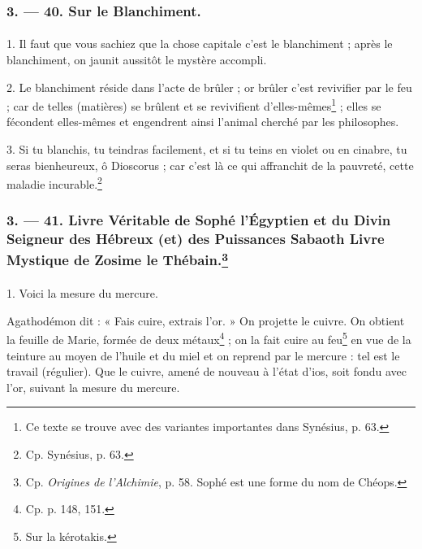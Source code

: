 \documentclass[a4paper, 11pt, oneside, polutonikogreek, french]{article}
\begin{document}
\bigskip
\centerline{\EightStarTaper}
\centerline{\EightStarTaper\EightStarTaper}
\bigskip

\subsubsection{3. --- 40. Sur le Blanchiment.}
\paragraph{}
1. Il faut que vous sachiez que la chose capitale c'est le blanchiment ; après le blanchiment, on jaunit aussitôt le mystère accompli.

2. Le blanchiment réside dans l'acte de brûler ; or brûler c'est revivifier par le feu ; car de telles (matières) se brûlent et se revivifient d'elles-mêmes\footnote{Ce texte se trouve avec des variantes importantes dans Synésius, p. 63.} ; elles se fécondent elles-mêmes et engendrent ainsi l'animal cherché par les philosophes.

3. Si tu blanchis, tu teindras facilement, et si tu teins en violet ou en cinabre, tu seras bienheureux, ô Dioscorus ; car c'est là ce qui affranchit de la pauvreté, cette maladie incurable.\footnote{Cp. Synésius, p. 63.}

\bigskip
\centerline{\EightStarTaper}
\centerline{\EightStarTaper\EightStarTaper}
\bigskip

\subsubsection[3. --- 41. Livre Véritable de Sophé l'Égyptien et du Divin Seigneur des Hébreux (et) des Puissances Sabaoth Livre Mystique de Zosime le Thébain.]{3. --- 41. Livre Véritable de Sophé l'Égyptien et du Divin Seigneur des Hébreux (et) des Puissances Sabaoth Livre Mystique de Zosime le Thébain.\footnote{Cp. \emph{Origines de l'Alchimie}, p. 58. Sophé est une forme du nom de Chéops.}}
\paragraph{}
1. Voici la mesure du mercure.

Agathodémon dit : « Fais cuire, extrais l'or. » On projette le cuivre. On obtient la feuille de Marie, formée de deux métaux\footnote{Cp. p. 148, 151.} ; on la fait cuire au feu\footnote{Sur la kérotakis.} en vue de la teinture au moyen de l'huile et du miel et on reprend par le mercure : tel est le travail (régulier). Que le cuivre, amené de nouveau à l'état d'ios, soit fondu avec l'or, suivant la mesure du mercure.
\end{document}
